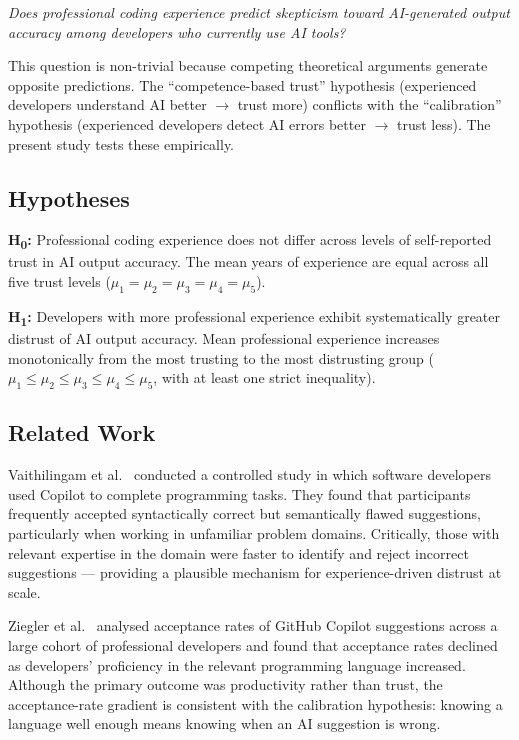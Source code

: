 \documentclass[11pt,a4paper]{article}
\begin{document}
\emph{Does professional coding experience predict skepticism toward AI-generated output
accuracy among developers who currently use AI tools?}

This question is non-trivial because competing theoretical arguments generate opposite
predictions. The ``competence-based trust'' hypothesis (experienced developers understand
AI better $\rightarrow$ trust more) conflicts with the ``calibration'' hypothesis
(experienced developers detect AI errors better $\rightarrow$ trust less). The present
study tests these empirically.

\subsection{Hypotheses}

\noindent\textbf{H\textsubscript{0}:} Professional coding experience does not differ
across levels of self-reported trust in AI output accuracy. The mean years of experience
are equal across all five trust levels ($\mu_1 = \mu_2 = \mu_3 = \mu_4 = \mu_5$).

\noindent\textbf{H\textsubscript{1}:} Developers with more professional experience
exhibit systematically greater distrust of AI output accuracy. Mean professional
experience increases monotonically from the most trusting to the most distrusting group
($\mu_1 \leq \mu_2 \leq \mu_3 \leq \mu_4 \leq \mu_5$, with at least one strict inequality).

\subsection{Related Work}

Vaithilingam et al.\ \cite{vaithilingam2022expectation} conducted a controlled study
in which software developers used Copilot to complete programming tasks. They found that
participants frequently accepted syntactically correct but semantically flawed suggestions,
particularly when working in unfamiliar problem domains. Critically, those with relevant
expertise in the domain were faster to identify and reject incorrect suggestions ---
providing a plausible mechanism for experience-driven distrust at scale.

Ziegler et al.\ \cite{ziegler2022productivity} analysed acceptance rates of GitHub Copilot
suggestions across a large cohort of professional developers and found that acceptance
rates declined as developers' proficiency in the relevant programming language increased.
Although the primary outcome was productivity rather than trust, the acceptance-rate
gradient is consistent with the calibration hypothesis: knowing a language well enough
means knowing when an AI suggestion is wrong.
\end{document}
